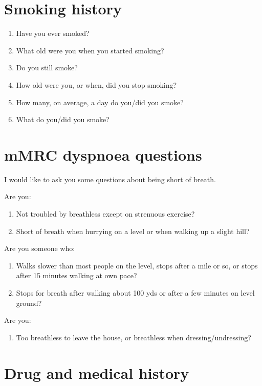 \documentclass[a4paper,10pt]{article}
\begin{document}
\section{Smoking history}

\begin{enumerate}
\item Have you ever smoked?
\item What old were you when you started smoking?
\item Do you still smoke?
\item How old were you, or when, did you stop smoking?
\item How many, on average, a day do you/did you smoke?
\item What do you/did you smoke?
\end{enumerate}

\section{mMRC dyspnoea questions} 

I would like to ask you some questions about being short of breath.

Are you:

\begin{enumerate}
\item Not troubled by breathless except on strenuous exercise?
\item Short of breath when hurrying on a level or when walking up a slight hill?
\end{enumerate}

Are you someone who:

\begin{enumerate}[resume]
\item Walks slower than most people on the level, stops after a mile or so, or stops after 15 minutes walking at own pace?
\item Stops for breath after walking about 100 yds or after a few minutes on level ground?
\end{enumerate}

Are you:

\begin{enumerate}[resume]
\item Too breathless to leave the house, or breathless when dressing/undressing?
\end{enumerate}

\section{Drug and medical history}
\end{document}
